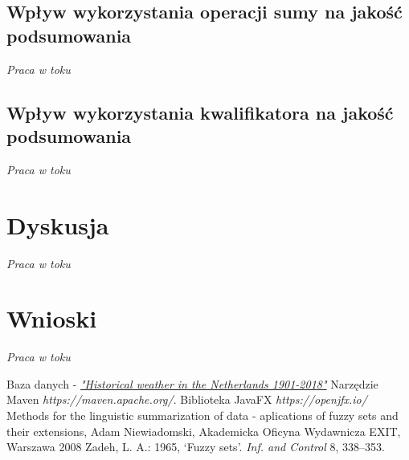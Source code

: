 \documentclass{classrep}
\begin{document}
\clearpage



\subsection{Wpływ wykorzystania operacji sumy na jakość podsumowania}
\textit{Praca w toku}

\subsection{Wpływ wykorzystania kwalifikatora na jakość podsumowania}
\textit{Praca w toku}




\section{Dyskusja}
\textit{Praca w toku}


\section{Wnioski}
\textit{Praca w toku}


\begin{thebibliography}{5}
Baza danych - 
\href{https://www.kaggle.com/sinaasappel/historical-weather-in-the-netherlands-19012018}{\textit{"Historical weather in the Netherlands 1901-2018"}}
Narzędzie Maven\newline
\textit{https://maven.apache.org/}. 
Biblioteka JavaFX\newline
\textit{https://openjfx.io/}
Methods for the linguistic summarization of data - aplications of fuzzy sets and their extensions, Adam Niewiadomski, Akademicka Oficyna Wydawnicza EXIT, Warszawa 2008
Zadeh, L. A.: 1965, ‘Fuzzy sets’.  \textit{Inf. and Control} 8, 338–353.
\end{thebibliography}
\end{document}
